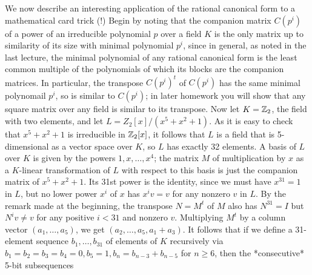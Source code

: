 We now describe an interesting application of the rational canonical form to a mathematical card trick (!)  Begin by noting that the companion matrix $C(p^i)$ of a power of an irreducible polynomial $p$ over a field $K$ is the only matrix up to similarity of its size with minimal polynomial $p^i$, since in general, as noted in the last lecture, the minimal polynomial of any rational canonical form is the least common multiple of the polynomials of which its blocks are the companion matrices.  In particular, the transpose $C(p^i)^t$ of $C(p^i)$ has the same minimal polynomail $p^i$, so is similar to $C(p^i)$; in later homework you will show that any square matrix over any field is similar to its transpose.  Now let
$K=\Bbb Z_2$, the field with two elements, and let $L=Z_2[x]/(x^5 + x^2 + 1)$.  As it is easy to check that $x^5 + x^2 + 1$ is irreducible in $\Bbb Z_2[x]$, it follows that $L$ is a field that is 5-dimensional as a vector space over $K$, so $L$ has exactly 32 elements.  A basis of $L$ over $K$ is given by the powers $1,x,\ldots,x^4$; the matrix $M$ of multiplication by $x$ as a $K$-linear transformation of $L$ with respect to this basis is just the companion matrix of $x^5 + x^2 + 1$.  Its 31st power is the identity, since we must have $x^31 = 1$ in $L$, but no lower power $x^i$ of $x$ has $x^i v = v$ for any nonzero $v$ in $L$.  By the remark made at the beginning, the transpose $N=M^t$ of $M$ also has $N^{31} = I$ but $N^i v\ne v$ for any positive $i<31$ and nonzero $v$.  Multiplying $M^t$ by a column vector $(a_1,\ldots,a_5)$, we get $(a_2,\ldots,a_5,a_1 + a_3)$.  It follows that if we define a 31-element sequence $b_1,\ldots,b_{31}$ of elements of $K$ recursively via $b_1=b_2=b_3=b_4=0, b_5=1, b_n = b_{n-3}+b_{n-5}$ for $n\ge6$, then the *consecutive* 5-bit subsequences
